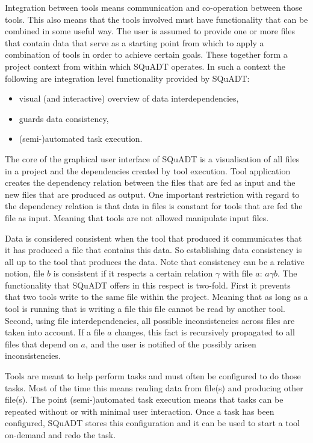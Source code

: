 \documentclass{article}
\newcommand{\squadt}{SQuADT\xspace}
\begin{document}
  Integration between tools means communication and co-operation between those
  tools. This also means that the tools involved must have functionality that
  can be combined in some useful way. The user is assumed to provide one or
  more files that contain data that serve as a starting point from which to
  apply a combination of tools in order to achieve certain goals. These
  together form a project context from within which \squadt operates.
  In such a context the following are integration level functionality provided by \squadt:
   \begin{itemize}
    \item visual (and interactive) overview of data interdependencies,
    \item guards data consistency,
    \item (semi-)automated task execution.
   \end{itemize}

  \noindent The core of the graphical user interface of \squadt is a
  visualisation of all files in a project and the dependencies created by tool
  execution. Tool application creates the dependency relation between the files
  that are fed as input and the new files that are produced as output. One
  important restriction with regard to the dependency relation is that data in
  files is constant for tools that are fed the file as input. Meaning that
  tools are not allowed manipulate input files.
  
  Data is considered consistent when the tool that produced it communicates
  that it has produced a file that contains this data. So establishing data
  consistency is all up to the tool that produces the data. Note that
  consistency can be a relative notion, file $b$ is consistent if it respects a
  certain relation $\gamma$ with file $a$: $a \gamma b$. The functionality that
  \squadt offers in this respect is two-fold. First it prevents that two tools
  write to the same file within the project. Meaning that as long as a tool is
  running that is writing a file this file cannot be read by another tool.
  Second, using file interdependencies, all possible inconsistencies across
  files are taken into account.  If a file $a$ changes, this fact is
  recursively propagated to all files that depend on $a$, and the user is
  notified of the possibly arisen inconsistencies.

  Tools are meant to help perform tasks and must often be configured to do
  those tasks. Most of the time this means reading data from file(s) and
  producing other file(s). The point (semi-)automated task execution means that
  tasks can be repeated without or with minimal user interaction. Once a task
  has been configured, \squadt stores this configuration and it can be used to
  start a tool on-demand and redo the task.
\end{document}
